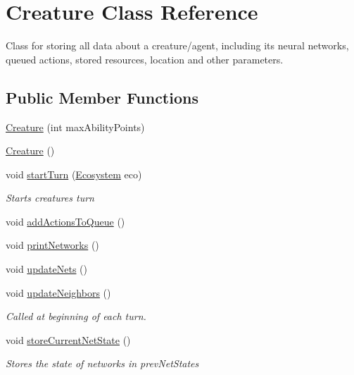 \hypertarget{class_creature}{}\section{Creature Class Reference}
\label{class_creature}


Class for storing all data about a creature/agent, including its neural networks, queued actions, stored resources, location and other parameters.  


\subsection*{Public Member Functions}
\begin{DoxyCompactItemize}
\item 
\mbox{\hyperlink{class_creature_a33b98848ab1feddad8bf7badb46f8e57}{Creature}} (int max\+Ability\+Points)
\item 
\mbox{\hyperlink{class_creature_acd97b133e2a8f2fb38a7686ffd7a3fdc}{Creature}} ()
\item 
void \mbox{\hyperlink{class_creature_a84d61b231641c1af50195151ab904ada}{start\+Turn}} (\mbox{\hyperlink{class_ecosystem}{Ecosystem}} eco)
\begin{DoxyCompactList}\small\item\em Starts creatures turn \end{DoxyCompactList}\item 
void \mbox{\hyperlink{class_creature_a5c8e2c97a66f511939fc89bd349017d3}{add\+Actions\+To\+Queue}} ()
\item 
void \mbox{\hyperlink{class_creature_a46fa0cc06932a4cdba0e7b1f8f2dad9c}{print\+Networks}} ()
\item 
void \mbox{\hyperlink{class_creature_ad9f8df80e830988e67bf3eeeb016689c}{update\+Nets}} ()
\item 
void \mbox{\hyperlink{class_creature_aeaf23c7008fa80ca8897d13b5435e1fc}{update\+Neighbors}} ()
\begin{DoxyCompactList}\small\item\em Called at beginning of each turn. \end{DoxyCompactList}\item 
void \mbox{\hyperlink{class_creature_a372a0b61e98758214fddc2564dc649f2}{store\+Current\+Net\+State}} ()
\begin{DoxyCompactList}\small\item\em Stores the state of networks in prev\+Net\+States \end{DoxyCompactList}\item 

\end{DoxyCompactItemize}
